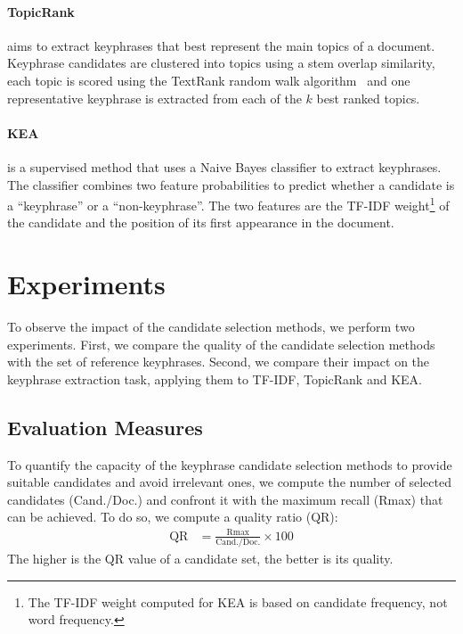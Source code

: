   \paragraph{TopicRank~\textnormal{\cite{bougouin2013topicrank}}} aims to
  extract keyphrases that best represent the main topics of a document.
  Keyphrase candidates are clustered into topics using a stem overlap
  similarity, each topic is scored using the TextRank random walk
  algorithm~\cite{mihalcea2004textrank} and one representative keyphrase is
  extracted from each of the $k$ best ranked topics.

  \paragraph{KEA~\textnormal{\cite{witten1999kea}}} is a supervised method that
  uses a Naive Bayes classifier to extract keyphrases. The classifier combines
  two feature probabilities to predict whether a candidate is a ``keyphrase'' or
  a ``non-keyphrase''. The two features are the TF-IDF weight\footnote{The
    TF-IDF weight computed for KEA is based on candidate frequency, not word
  frequency.} of the candidate and the position of its first appearance in the
  document.

\section{Experiments}
\label{sec:evaluation}
  To observe the impact of the candidate selection methods, we perform two
  experiments. First, we compare the quality of the candidate selection methods
  with the set of reference keyphrases. Second, we compare their impact on the
  keyphrase extraction task, applying them to TF-IDF, TopicRank and KEA.

  \subsection{Evaluation Measures}
  \label{subsec:keyphrase_extraction_evaluation_measures}
    To quantify the capacity of the keyphrase candidate selection methods to
    provide suitable candidates and avoid irrelevant ones, we compute the
    number of selected candidates (Cand./Doc.) and confront it with the
    maximum recall (Rmax) that can be achieved. To do so, we compute a quality
    ratio (QR):
    \begin{align}
      \text{QR} &= \frac{\text{Rmax}}{\text{Cand./Doc.}} \times 100
    \end{align}
    The higher is the QR value of a candidate set, the better is its quality.


